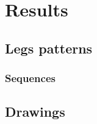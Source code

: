 \chapter{Results}

    \section{Legs patterns}
        \subsection{Sequences}
        
    \section{Drawings}
        
        